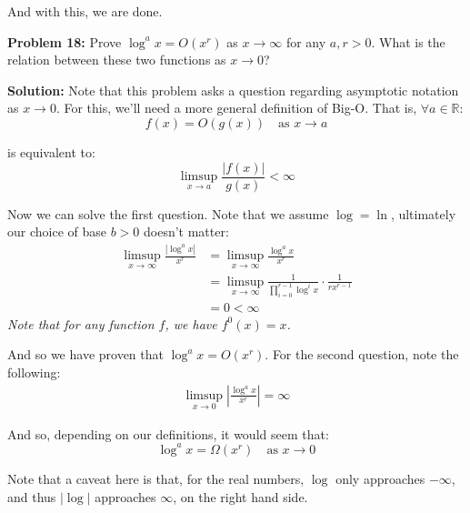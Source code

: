 \documentclass{article}
\newcommand{\R}{\mathbb R}
\begin{document}
And with this, we are done.
\bigskip

\noindent\textbf{Problem 18:} Prove $\log^a x = O(x^r)$ as $x\to\infty$ for any $a,r > 0$. What is the relation between these two functions as $x\to0$?
\bigskip

\noindent\textbf{Solution:} Note that this problem asks a question regarding asymptotic notation as $x\to0$. For this, we'll need a more general definition of Big-O. That is, $\forall a\in\R$:
$$f(x)=O(g(x))\quad\text{as }x\to a$$

is equivalent to:
$$\limsup_{x\to a}\frac{|f(x)|}{g(x)}<\infty$$

Now we can solve the first question. Note that we assume $\log=\ln$, ultimately our choice of base $b>0$ doesn't matter:
\begin{align*}
  \limsup_{x\to\infty}\frac{|\log^a x|}{x^r}&=\limsup_{x\to\infty}\frac{\log^a x}{x^r}\tag{$x,a>0$}\\
  &=\limsup_{x\to\infty}\frac{1}{\prod_{i=0}^{r-1}\log^i x}\cdot\frac{1}{rx^{r-1}}\tag{L'Hopital's rule}\\
  &=0<\infty
\end{align*}
\textit{Note that for any function $f$, we have $f^0(x)=x$.}
\bigskip

And so we have proven that $\log^a x=O(x^r)$. For the second question, note the following:
\begin{align*}
  \limsup_{x\to0}\left|\frac{\log^a x}{x^r}\right|=\infty
\end{align*}

And so, depending on our definitions, it would seem that:
$$\log^a x=\Omega(x^r)\quad\text{as } x\to 0$$

Note that a caveat here is that, for the real numbers, $\log$ only approaches $-\infty$, and thus $|\log|$ approaches $\infty$, on the right hand side.
\end{document}

